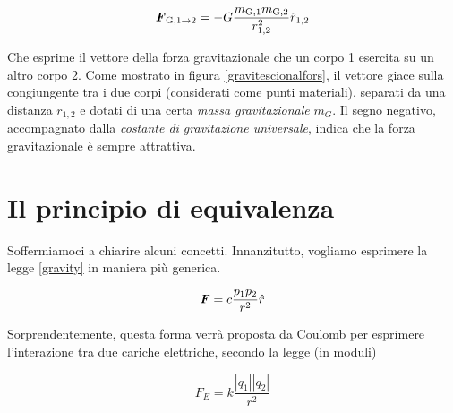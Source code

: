 \vspace{8pt}
\begin{tcolorbox}[colback = yellow!30, colframe = yellow!30!black, title = {Legge di gravitazione universale}]
    \begin{align}
        \textbf{\textit{F}}_{\text{G}, 1\to 2} = -G\frac{m_{\text{G},1}m_{\text{G},2}}{r^2_{1,2}}\hat{r}_{1,2}\label{gravity}
    \end{align}    
\end{tcolorbox}
\vspace{5pt}

\noindent Che esprime il vettore della forza gravitazionale che un corpo 1 esercita su un
altro corpo 2. Come mostrato in figura \ref{gravitescionalfors}, il vettore giace sulla congiungente tra i due corpi (considerati come
punti materiali), separati da una distanza $r_{1,2}$ e dotati di una certa
\textit{massa gravitazionale} $m_G$. Il segno negativo, accompagnato dalla
\textit{costante di gravitazione universale}, indica che la forza gravitazionale è
sempre attrattiva.

\section{Il principio di equivalenza}
Soffermiamoci a chiarire alcuni concetti. Innanzitutto, vogliamo esprimere la legge
\ref{gravity} in maniera più generica.

\begin{align}
    \textbf{\textit{F}} = c\frac{p_1p_2}{r^2}\hat{r} \label{template}
\end{align}

\noindent Sorprendentemente, questa forma verrà proposta da Coulomb per esprimere
l'interazione tra due cariche elettriche, secondo la legge (in moduli)

\[ F_E = k\frac{|q_1||q_2|}{r^2} \]


